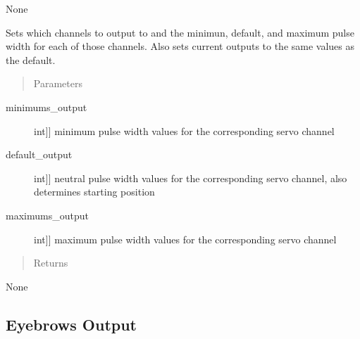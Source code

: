 \documentclass[letterpaper,10pt,english]{sphinxmanual}
\begin{document}
\begin{fulllineitems}
\begin{fulllineitems}
\sphinxAtStartPar
None

\end{fulllineitems}


\begin{fulllineitems}
\label{\detokenize{specific:EarOutput.EarOutput.set_outputs}}
\sphinxAtStartPar
Sets which channels to output to and the minimun, default, and maximum pulse width for each of those channels.
Also sets current outputs to the same values as the default.
\begin{quote}\begin{description}
\item[{Parameters}] \leavevmode
\end{description}\end{quote}
\begin{description}
\item[{minimums\_output}] \leavevmode{[}{[}int{]}{]}
\sphinxAtStartPar
minimum pulse width values for the corresponding servo channel

\item[{default\_output}] \leavevmode{[}{[}int{]}{]}
\sphinxAtStartPar
neutral pulse width values for the corresponding servo channel, also determines starting position

\item[{maximums\_output}] \leavevmode{[}{[}int{]}{]}
\sphinxAtStartPar
maximum pulse width values for the corresponding servo channel

\end{description}
\begin{quote}\begin{description}
\item[{Returns}] \leavevmode
\end{description}\end{quote}

\sphinxAtStartPar
None

\end{fulllineitems}


\end{fulllineitems}



\subsection{Eyebrows Output}
\label{\detokenize{specific:module-EyebrowsOutput}}\label{\detokenize{specific:eyebrows-output}}
\end{document}

